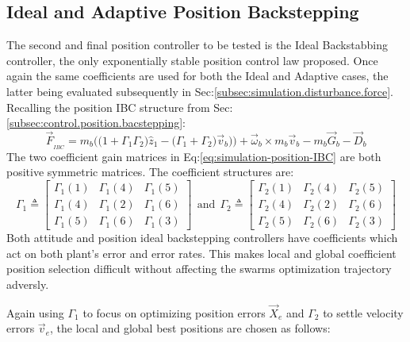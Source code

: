 \subsection{Ideal and Adaptive Position Backstepping}
\label{subsec:simulation.position.pd}
The second and final position controller to be tested is the Ideal Backstabbing controller, the only exponentially stable position control law proposed. Once again the same coefficients are used for both the Ideal and Adaptive cases, the latter being evaluated subsequently in Sec:\ref{subsec:simulation.disturbance.force}. Recalling the position IBC structure from Sec:\ref{subsec:control.position.bacstepping}:
\begin{equation}\label{eq:simulation-position-IBC}
\vec{F}_{_{IBC}}=m_b\Big(\big(1+\Gamma_1\Gamma_2\big)\hat{z}_1-\big(\Gamma_1+\Gamma_2\big)\vec{v}_b\big)\Big)+\vec{\omega}_b\times m_b\vec{v}_b-m_b\vec{G}_b-\vec{D}_b
\end{equation}
The two coefficient gain matrices in Eq:\ref{eq:simulation-position-IBC} are both positive symmetric matrices. The coefficient structures are:
\begin{equation}\label{eq:simulation-position-diagonal-coefficients}
\Gamma_1\triangleq \begin{bmatrix}
\Gamma_1(1) & \Gamma_1(4) & \Gamma_1(5)\\
\Gamma_1(4) & \Gamma_1(2) & \Gamma_1(6)\\
\Gamma_1(5) & \Gamma_1(6) & \Gamma_1(3)
\end{bmatrix}
~~\text{and}~~\Gamma_2\triangleq \begin{bmatrix}
\Gamma_2(1) & \Gamma_2(4) & \Gamma_2(5)\\
\Gamma_2(4) & \Gamma_2(2) & \Gamma_2(6)\\
\Gamma_2(5) & \Gamma_2(6) & \Gamma_2(3)
\end{bmatrix}
\end{equation}
Both attitude and position ideal backstepping controllers have coefficients which act on both plant's error and error rates. This makes local and global coefficient position selection difficult without affecting the swarms optimization trajectory adversly. 
\par
Again using $\Gamma_1$ to focus on optimizing position errors $\vec{X}_e$ and $\Gamma_2$ to settle velocity errors $\vec{v}_e$, the local and global best positions are chosen as follows:
